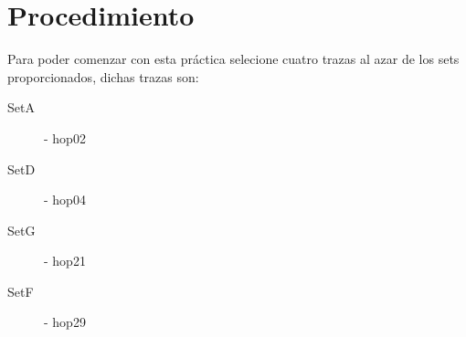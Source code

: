 
\section*{Procedimiento}

\noindent Para poder comenzar con esta pr\'actica selecione cuatro trazas al azar de los sets
proporcionados, dichas trazas son:

\begin{description}
    \item[SetA] - hop02
    \item[SetD] - hop04
    \item[SetG] - hop21
    \item[SetF] - hop29 
\end{description}

